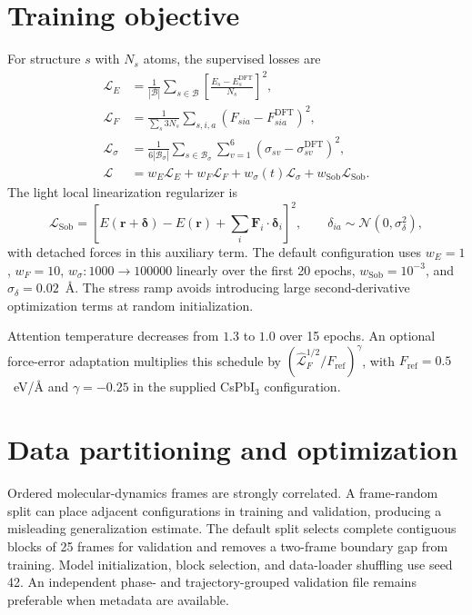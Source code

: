 \documentclass[10pt]{article}
\newcommand{\calL}{\mathcal{L}}
\newcommand{\vect}[1]{\bm{#1}}
\begin{document}
\section{Training objective}

For structure $s$ with $N_s$ atoms, the supervised losses are
\begin{align}
 \calL_E&=\frac{1}{|\mathcal B|}\sum_{s\in\mathcal B}
 \left[\frac{E_s-E_s^{\mathrm{DFT}}}{N_s}\right]^2,\\
 \calL_F&=\frac{1}{\sum_s3N_s}\sum_{s,i,a}
 \left(F_{sia}-F_{sia}^{\mathrm{DFT}}\right)^2,\\
 \calL_\sigma&=\frac{1}{6|\mathcal B_\sigma|}
 \sum_{s\in\mathcal B_\sigma}\sum_{v=1}^{6}
 \left(\sigma_{sv}-\sigma_{sv}^{\mathrm{DFT}}\right)^2,\\
 \calL&=w_E\calL_E+w_F\calL_F+w_\sigma(t)\calL_\sigma
 +w_{\mathrm{Sob}}\calL_{\mathrm{Sob}}.
 \label{eq:loss}
\end{align}
The light local linearization regularizer is
\begin{equation}
 \calL_{\mathrm{Sob}}=
 \left[E(\vect r+\vect\delta)-E(\vect r)
 +\sum_i\vect F_i\cdot\vect\delta_i\right]^2,
 \qquad \delta_{ia}\sim\mathcal N(0,\sigma_\delta^2),
\end{equation}
with detached forces in this auxiliary term. The default configuration uses
$w_E=1$, $w_F=10$, $w_\sigma:1000\rightarrow100000$ linearly over the first
20 epochs, $w_{\mathrm{Sob}}=10^{-3}$, and $\sigma_\delta=0.02$~\AA. The stress
ramp avoids introducing large second-derivative optimization terms at random
initialization.

Attention temperature decreases from $1.3$ to $1.0$ over 15 epochs. An optional
force-error adaptation multiplies this schedule by
$(\widehat{\calL}_F^{1/2}/F_{\mathrm{ref}})^\gamma$, with
$F_{\mathrm{ref}}=0.5$~eV/\AA{} and $\gamma=-0.25$ in the supplied CsPbI$_3$
configuration.

\section{Data partitioning and optimization}

Ordered molecular-dynamics frames are strongly correlated. A frame-random split
can place adjacent configurations in training and validation, producing a
misleading generalization estimate. The default split selects complete
contiguous blocks of 25 frames for validation and removes a two-frame boundary
gap from training. Model initialization, block selection, and data-loader
shuffling use seed 42. An independent phase- and trajectory-grouped validation
file remains preferable when metadata are available.
\end{document}
